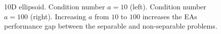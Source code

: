 \begin{figure}[h!]
\begin{minipage}[b]{0.5\linewidth}
 \centering
\end{minipage}
\begin{minipage}[b]{0.5\linewidth}
 \centering
\end{minipage}
\caption{10D ellipsoid. Condition number $a\!=\!10$ (left). Condition number $a\!=\!100$ (right). Increasing $a$ from $10$ to $100$  increases the EAs performance gap between the separable and non-separable problems.} 
\label{ellipse_t1}
\end{figure}


